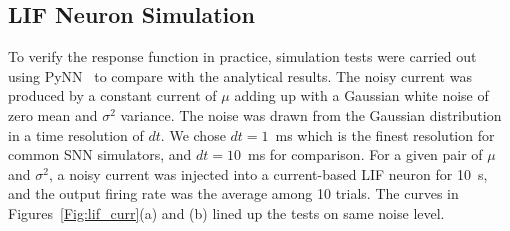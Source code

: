 %	
	
	
	
	
	\subsection{LIF Neuron Simulation}
	\label{subsec:practice}
	To verify the response function in practice, simulation tests were carried out using PyNN~\cite{davison2008pynn} to compare with the analytical results.
	The noisy current was produced by a constant current of $\mu$ adding up with a Gaussian white noise of zero mean and $\sigma^2$ variance.
	The noise was drawn from the Gaussian distribution in a time resolution of $dt$.
	We chose $dt=1$~ms which is the finest resolution for common SNN simulators, and $dt=10$~ms for comparison.
	For a given pair of $\mu$ and $\sigma^2$, a noisy current was injected into a current-based LIF neuron for 10~s, and the output firing rate was the average among 10 trials.
	The curves in Figures~\ref{Fig:lif_curr}(a) and (b) lined up the tests on same noise level.
	
